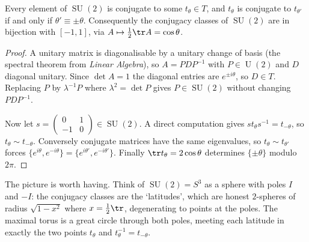\documentclass[a4paper]{scrartcl}
\newcommand{\U}{\operatorname{U}}
\newcommand{\SU}{\operatorname{SU}}
\begin{document}
\begin{proposition}
	Every element of $\SU(2)$ is conjugate to some $t_\theta \in T$, and $t_\theta$ is conjugate to $t_{\theta'}$ if and only if $\theta' \equiv\pm\theta$. Consequently the conjugacy classes of $\SU(2)$ are in bijection with $[-1,1]$, via $A\mapsto\frac12\tr A = \cos\theta$.
\end{proposition}
\begin{proof}
	A unitary matrix is diagonalisable by a unitary change of basis (the spectral theorem from \emph{Linear Algebra}), so $A = PDP^{-1}$ with $P\in\U(2)$ and $D$ diagonal unitary. Since $\det A = 1$ the diagonal entries are $e^{\pm i\theta}$, so $D\in T$. Replacing $P$ by $\lambda^{-1}P$ where $\lambda^2 = \det P$ gives $P\in\SU(2)$ without changing $PDP^{-1}$.

	Now let $s = \left(\begin{smallmatrix}0&1\\-1&0\end{smallmatrix}\right)\in\SU(2)$. A direct computation gives $st_\theta s^{-1} = t_{-\theta}$, so $t_\theta\sim t_{-\theta}$. Conversely conjugate matrices have the same eigenvalues, so $t_\theta\sim t_{\theta'}$ forces $\{e^{i\theta},e^{-i\theta}\} = \{e^{i\theta'},e^{-i\theta'}\}$. Finally $\tr t_\theta = 2\cos\theta$ determines $\{\pm\theta\}$ modulo $2\pi$.
\end{proof}

The picture is worth having. Think of $\SU(2) = S^3$ as a sphere with poles $I$ and $-I$: the conjugacy classes are the `latitudes', which are honest $2$-spheres of radius $\sqrt{1-x^2}$ where $x = \frac12\tr$, degenerating to points at the poles. The maximal torus is a great circle through both poles, meeting each latitude in exactly the two points $t_\theta$ and $t_\theta^{-1} = t_{-\theta}$.

\begin{center}
\end{center}
\vspace{0.4em}
\end{document}
